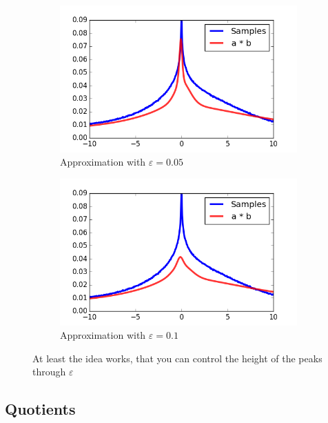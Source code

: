 \documentclass[11pt,a4paper]{book}
\begin{document}
\begin{figure}[h]
  \centering
  \begin{subfigure}[t]{0.45\textwidth}
    \centering
    \includegraphics[width=\textwidth]{thesis/operations/product-laguerre-5}
    \caption{Approximation with $\varepsilon = 0.05$}
  \end{subfigure}
  \hfill
  \begin{subfigure}[t]{0.45\textwidth}
    \centering
    \includegraphics[width=\textwidth]{thesis/operations/product-laguerre-10}
    \caption{Approximation with $\varepsilon = 0.1$}
  \end{subfigure}
  \caption{At least the idea works, that you can control the height of the peaks
    through $\varepsilon$}
  \label{fig:product-laguerre}
\end{figure}

\subsection{Quotients}
\end{document}
